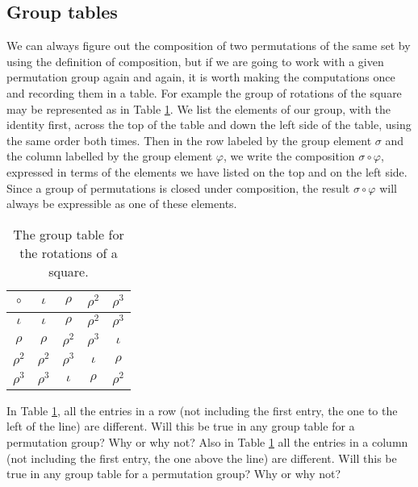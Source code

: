 \subsection{Group tables}
We can always figure out the composition of two permutations of the same
set by using the definition of composition, but if we are going to work
with a given permutation group again and again, it is worth making the
computations once and recording them in a table.  For example the group
of rotations of the square may be represented as in Table
\ref{rotationgrouptable}.  We list the elements of our group, with the
identity first, across the top of the table and down the left side of the
table, using the same order both times.  Then in the row labeled by the
group element $\sigma$ and the column labelled by the group element
$\varphi$, we write the composition $\sigma\circ \varphi$, expressed in
terms of the elements we have listed on the top and on the left side. 
Since a group of permutations is closed under composition, the result
$\sigma\circ \varphi$ will always be expressible as one of these elements.


\begin{table}[htb]\caption{The group
table for the rotations of a square.}\label{rotationgrouptable}\smallskip
\begin{center}
\begin{tabular}{|c|c c c c|}
\hline
$\circ$&$\iota$&$\rho$&$\rho^2$&$\rho^3$\\
\hline
$\iota$&$\iota$&$\rho$&$\rho^2$&$\rho^3$\\
$\rho$&$\rho$&$\rho^2$&$\rho^3$&$\iota$\\
$\rho^2$&$\rho^2$&$\rho^3$&$\iota$&$\rho$\\
$\rho^3$&$\rho^3$&$\iota$&$\rho$&$\rho^2$\\
\hline
\end{tabular}
\end{center}  
\end{table}

\bp
\item In Table \ref{rotationgrouptable}, all the entries in a row (not
including the first entry, the one to the left of the line) are
different.  Will this be true in any group table for a permutation
group?  Why or why not? Also in Table
\ref{rotationgrouptable} all the entries in a column (not including the
first entry, the one above the line) are different.  Will this be true in
any group table for a permutation group?  Why or why not?

